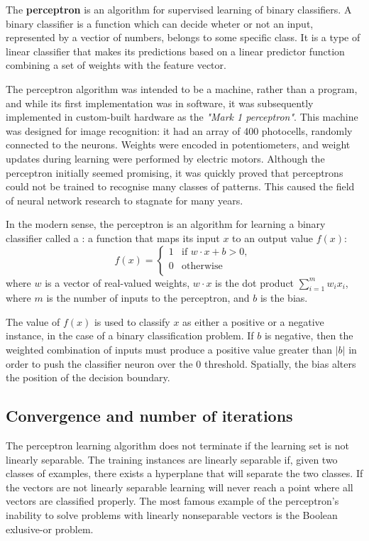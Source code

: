 The \textbf{perceptron} is an algorithm for supervised learning of binary classifiers. A binary classifier is a function which can decide wheter or not an input, represented by a vectior of numbers, belongs to some specific class. It is a type of linear classifier that makes its predictions based on a linear predictor function combining a set of weights with the feature vector.

The perceptron algorithm was intended to be a machine, rather than a program, and while its first implementation was in software, it was subsequently implemented in custom-built hardware as the \emph{"Mark 1 perceptron"}. This machine was designed for image recognition: it had an array of 400 photocells, randomly connected to the neurons. Weights were encoded in potentiometers, and weight updates during learning were performed by electric motors. Although the perceptron initially seemed promising, it was quickly proved that perceptrons could not be trained to recognise many classes of patterns. This caused the field of neural network research to stagnate for many years.

In the modern sense, the perceptron is an algorithm for learning a binary classifier called a : a function that maps its input \(x\) to an output value \(f(x)\):
\begin{equation}
    f(x) = \begin{cases}
        1 &\text{if \(w \cdot x + b > 0\), } \\
        0 &\text{otherwise}\\
    \end{cases}
\end{equation}
where \(w\) is a vector of real-valued weights, \(w \cdot x\) is the dot product \(\sum_{i=1}^mw_ix_i\), where \(m\) is the number of inputs to the perceptron, and \(b\) is the bias.

The value of \(f(x)\) is used to classify \(x\) as either a positive or a negative instance, in the case of a binary classification problem. If \(b\) is negative, then the weighted combination of inputs must produce a positive value greater than \(|b|\) in order to push the classifier neuron over the 0 threshold. Spatially, the bias alters the position of the decision boundary. 

\subsection{Convergence and number of iterations}
The perceptron learning algorithm does not terminate if the learning set is not linearly separable. The training instances are linearly separable if, given two classes of examples, there exists a hyperplane that will separate the two classes. If the vectors are not linearly separable learning will never reach a point where all vectors are classified properly. The most famous example of the perceptron's inability to solve problems with linearly nonseparable vectors is the Boolean exlusive-or problem.

